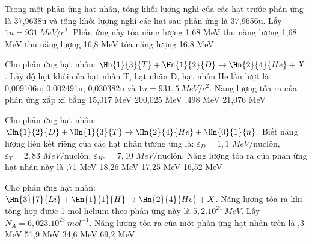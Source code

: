 \begin{vidu}%
 Trong một phản ứng hạt nhân, tổng khối lượng nghỉ của các hạt trước phản ứng là 37,9638u và tổng khối lượng nghỉ các hạt sau phản ứng là 37,9656u. Lấy $1u=931\ MeV/c^2$. Phản ứng này	
\choice
{tỏa năng lượng 1,68 MeV}
{\True thu năng lượng 1,68 MeV}
{thu năng lượng 16,8 MeV}
{tỏa năng lượng 16,8 MeV}

\end{vidu}
\begin{vidu}%
 Cho phản ứng hạt nhân: $\Hn{1}{3}{T}+\Hn{1}{2}{D}\rightarrow \Hn{2}{4}{He}+X$. Lấy độ hụt khối của hạt nhân T, hạt nhân D, hạt nhân He lần lượt là 0,009106u; 0,002491u; 0,030382u và $1u = 931,5\ MeV/c^2$. Năng lượng tỏa ra của phản ứng xấp xỉ bằng
\choice
{15,017 MeV}
{200,025 MeV}
{,498 MeV}
{21,076 MeV}
\end{vidu}
\begin{vidu}%
Cho phản ứng hạt nhân: $\Hn{1}{2}{D}+\Hn{1}{3}{T}\to \Hn{2}{4}{He}+\Hn{0}{1}{n}$. Biết năng lượng liên kết riêng của các hạt nhân tương ứng là: 
${\varepsilon}_{D}=1,1$ $MeV/\text{nuclôn}$, ${\varepsilon}_{T}=2,83$ $MeV/\text{nuclôn}$, ${\varepsilon}_{He}=7,10$ $MeV/\text{nuclôn}$. Năng lượng tỏa ra của phản ứng hạt nhân này là
\choice
{,71 MeV}
{18,26 MeV}
{17,25 MeV}
{16,52 MeV}	
\end{vidu}

\begin{vidu}%
 Cho phản ứng hạt nhân: $\Hn{3}{7}{Li}+\Hn{1}{1}{H}\to\Hn{2}{4}{He}+X$. Năng lượng tỏa ra khi tổng hợp được 1 mol helium theo phản ứng này là $5,{2.10}^{24}\ MeV$. Lấy $N_A=6,{023.10}^{23}\ mo{l}^{- 1}$. Năng lượng tỏa ra của một phản ứng hạt nhân trên là	
\choice
{,3 MeV}
{51,9 MeV}
{34,6 MeV}
{69,2 MeV}
\end{vidu}

